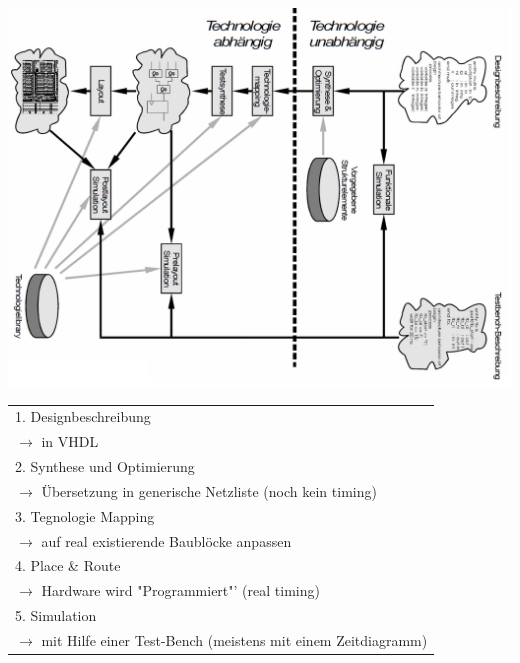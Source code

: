 \begin{minipage}{.6\textwidth}
	\includegraphics[width=\textwidth]{./bilder/FlowDesigen}
\end{minipage}
\begin{minipage}{.4\textwidth}
	\begin{tabular}{l}
		1. Designbeschreibung\\
		\quad $\rightarrow$ in VHDL \\
		2. Synthese und Optimierung\\
		\quad $\rightarrow$ Übersetzung in generische Netzliste {\tiny(noch kein timing)}\\
		3. Tegnologie Mapping\\
		\quad $\rightarrow$ auf real existierende Baublöcke anpassen\\
		4. Place \& Route\\
		\quad $\rightarrow$ Hardware wird "Programmiert"' (real timing)\\
		5. Simulation \\
		\quad $\rightarrow$ mit Hilfe einer Test-Bench {\tiny(meistens mit einem Zeitdiagramm)}\\
	\end{tabular}
\end{minipage}